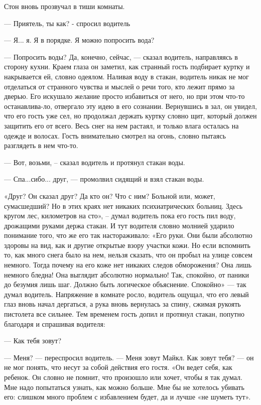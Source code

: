 Стон вновь прозвучал в тиши комнаты. 

— Приятель, ты как? - спросил водитель

— Я... я. Я в порядке. Я можно попросить вода?

— Попросить воды? Да, конечно, сейчас, — сказал водитель, направляясь в сторону кухни. Краем глаза он заметил, как странный гость подбирает куртку и накрывается ей, словно одеялом. Наливая воду в стакан, водитель никак не мог отделаться от странного чувства и мыслей о речи того, кто лежит прямо за дверью. Его искушало желание просто избавиться от него, но при этом что-то останавлива-ло, отвергало эту идею в его сознании. 
Вернувшись в зал, он увидел, что его гость уже сел, но продолжал держать куртку словно щит, который должен защитить его от всего. Весь снег на нем растаял, и только влага осталась на одежде и волосах. Гость внимательно смотрел на огонь, словно пытаясь разглядеть в нем что-то.

— Вот, возьми, – сказал водитель и протянул стакан воды.

— Спа...сибо... друг, — промолвил сидящий и взял стакан воды.

«Друг? Он сказал друг? Да кто он? Что с ним? Больной или, может, сумасшедший? Но в этих краях нет никаких психиатрических больниц. Здесь кругом лес, километров на сто», – думал водитель пока его гость пил воду, дрожащими руками держа стакан. И тут водителя словно молнией ударило понимание того, что же его так настораживало: «Его руки. Они были абсолютно здоровы на вид, как и другие открытые взору участки кожи. Но если вспомнить то, как много снега было на нем, нельзя сказать, что он пробыл на улице совсем немного. Тогда почему на его коже нет никаких следов обморожения? Она лишь немного бледна! Она выглядит абсолютно нормально! Так, спокойно, от паники до безумия лишь шаг. Должно быть логическое объяснение. Спокойно» — так думал водитель. Напряжение в комнате росло, водитель ощущал, что его левый глаз вновь начал дергаться, а рука вновь вернулась за спину, сжимая рукоять пистолета все сильнее. Тем временем гость допил и протянул стакан, попутно благодаря и спрашивая водителя:

— Как тебя зовут?

— Меня? — переспросил водитель. — Меня зовут Майкл. Как зовут тебя? — он не мог понять, что несут за собой действия его гостя. «Он ведет себя, как ребенок. Он словно не помнит, что произошло или хочет, чтобы я так думал. Мне надо попытаться узнать, как можно больше. Мне бы не хотелось убивать его: слишком много проблем с избавлением будет, да и лучше «не шуметь тут».

